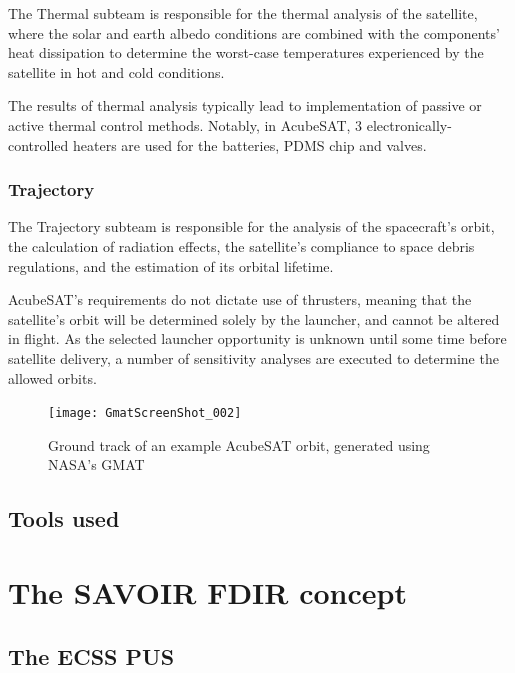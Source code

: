 \documentclass[a4paper,nobib]{tufte-book}
\begin{document}
The Thermal subteam is responsible for the thermal analysis of the satellite, where the solar and earth albedo conditions are combined with the components' heat dissipation to determine the worst-case temperatures experienced by the satellite in hot and cold conditions.

The results of thermal analysis typically lead to implementation of passive or active thermal control methods. Notably, in AcubeSAT, 3 electronically-controlled heaters are used for the batteries, \acs{PDMS} chip and valves.

\subsection{Trajectory}

The Trajectory subteam is responsible for the analysis of the spacecraft's orbit, the calculation of radiation effects, the satellite's compliance to space debris regulations, and the estimation of its orbital lifetime.

AcubeSAT's requirements do not dictate use of thrusters, meaning that the satellite's orbit will be determined solely by the launcher, and cannot be altered in flight. As the selected launcher opportunity is unknown until some time before satellite delivery, a number of sensitivity analyses are executed to determine the allowed orbits.

\begin{figure}
	\texttt{[image: GmatScreenShot\_002]}
	\caption[Ground track of an example AcubeSAT orbit, generated using NASA's GMAT]{Ground track of an example AcubeSAT orbit, generated using NASA's \acl{GMAT}}
	\label{fig:gmat}
\end{figure}


\section{Tools used}

\chapter{The SAVOIR \ac{FDIR} concept}

\section{The \acs{ECSS} \acl{PUS}}
\end{document}
